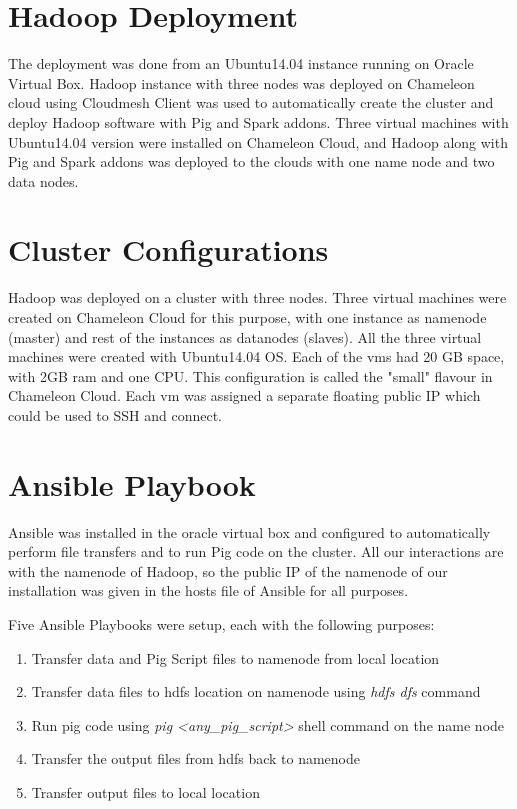 \documentclass[9pt,twocolumn,twoside]{../../styles/osajnl}
\begin{document}
\section{Hadoop Deployment}
The deployment was done from an Ubuntu14.04 instance running on Oracle Virtual Box. Hadoop instance with three nodes was deployed on Chameleon cloud using Cloudmesh Client was used to automatically create the cluster and deploy Hadoop software with Pig and Spark addons. Three virtual machines with Ubuntu14.04 version were installed on Chameleon Cloud, and Hadoop along with Pig and Spark addons was deployed to the clouds with one name node and two data nodes. 

\section{Cluster Configurations}
Hadoop was deployed on a cluster with three nodes. Three virtual machines were created on Chameleon Cloud for this purpose, with one instance as namenode (master) and rest of the instances as datanodes (slaves). All the three virtual machines were created with Ubuntu14.04 OS. Each of the vms had 20 GB space, with 2GB ram and one CPU. This configuration is called the "small" flavour in Chameleon Cloud. Each vm was assigned a separate floating public IP which could be used to SSH and connect. 

\section{Ansible Playbook}
Ansible was installed in the oracle virtual box and configured to automatically perform file transfers and to run Pig code on the cluster. All our interactions are with the namenode of  Hadoop, so the public IP of the namenode of our installation was given in the hosts file of Ansible for all purposes. 

Five Ansible Playbooks were setup, each with the following purposes:

\begin{enumerate}
    \item Transfer data and Pig Script files to namenode from local location
    \item Transfer data files to hdfs location on namenode using \textit{hdfs dfs} command
    \item Run pig code using \textit{pig <any\_pig\_script>} shell command on the name node
    \item Transfer the output files from hdfs back to namenode 
    \item Transfer output files to local location
\end{enumerate}
\end{document}
